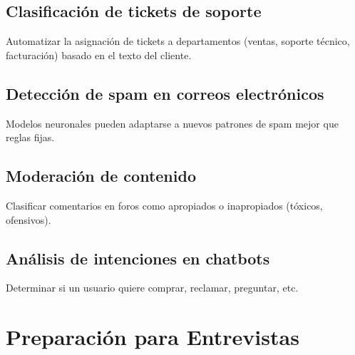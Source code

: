 \documentclass[12pt,a4paper,openany,oneside]{book}
\begin{document}
\subsection{Clasificación de tickets de soporte}
Automatizar la asignación de tickets a departamentos (ventas, soporte técnico, facturación) basado en el texto del cliente.

\subsection{Detección de spam en correos electrónicos}
Modelos neuronales pueden adaptarse a nuevos patrones de spam mejor que reglas fijas.

\subsection{Moderación de contenido}
Clasificar comentarios en foros como apropiados o inapropiados (tóxicos, ofensivos).

\subsection{Análisis de intenciones en chatbots}
Determinar si un usuario quiere comprar, reclamar, preguntar, etc.

\section{Preparación para Entrevistas}
\end{document}
